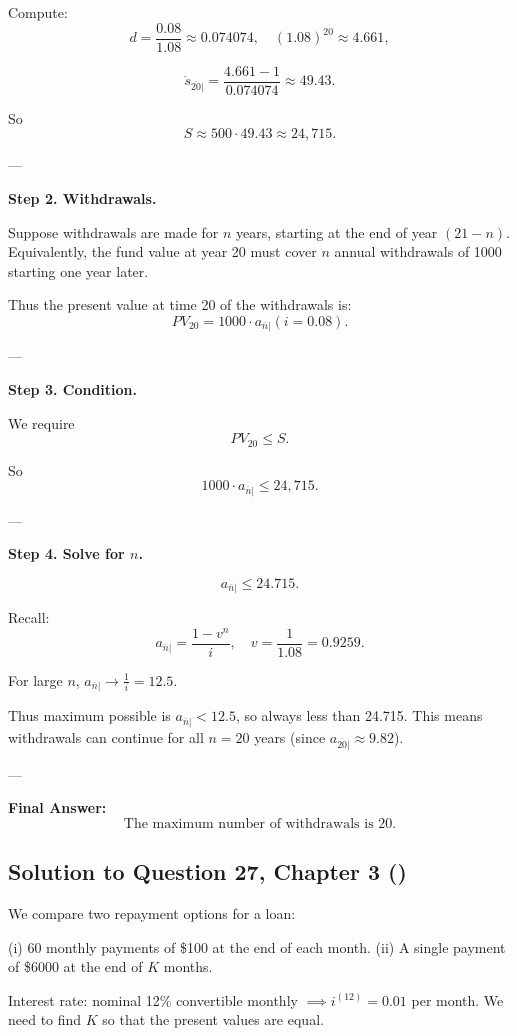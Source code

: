\documentclass[12pt, a4paper]{article}
\begin{document}
Compute:
\[
d = \frac{0.08}{1.08} \approx 0.074074,
\quad (1.08)^{20} \approx 4.661,
\]

\[
\ddot{s}_{\overline{20}|} = \frac{4.661-1}{0.074074} \approx 49.43.
\]

So
\[
S \approx 500 \cdot 49.43 \approx 24,715.
\]

---

\textbf{Step 2. Withdrawals.}

Suppose withdrawals are made for $n$ years, starting at the end of year $(21-n)$.  
Equivalently, the fund value at year 20 must cover $n$ annual withdrawals of 1000 starting one year later.

Thus the present value at time 20 of the withdrawals is:
\[
PV_{20} = 1000 \cdot a_{\overline{n}|}(i=0.08).
\]

---

\textbf{Step 3. Condition.}

We require
\[
PV_{20} \leq S.
\]

So
\[
1000 \cdot a_{\overline{n}|} \leq 24,715.
\]

---

\textbf{Step 4. Solve for $n$.}

\[
a_{\overline{n}|} \leq 24.715.
\]

Recall:
\[
a_{\overline{n}|} = \frac{1-v^n}{i}, \quad v=\frac{1}{1.08}=0.9259.
\]

For large $n$, $a_{\overline{n}|} \to \frac{1}{i} = 12.5$.

Thus maximum possible is $a_{\overline{n}|} < 12.5$, so always less than 24.715.  
This means withdrawals can continue for all $n=20$ years (since $a_{\overline{20}|} \approx 9.82$).

---

\textbf{Final Answer:}
\[
\boxed{\text{The maximum number of withdrawals is 20.}}
\]

\subsection*{Solution to Question 27, Chapter 3 (\cite{toi3rd})}

We compare two repayment options for a loan:

(i) 60 monthly payments of \$100 at the end of each month.  
(ii) A single payment of \$6000 at the end of $K$ months.  

Interest rate: nominal 12\% convertible monthly $\implies i^{(12)} = 0.01$ per month.  
We need to find $K$ so that the present values are equal.
\end{document}
